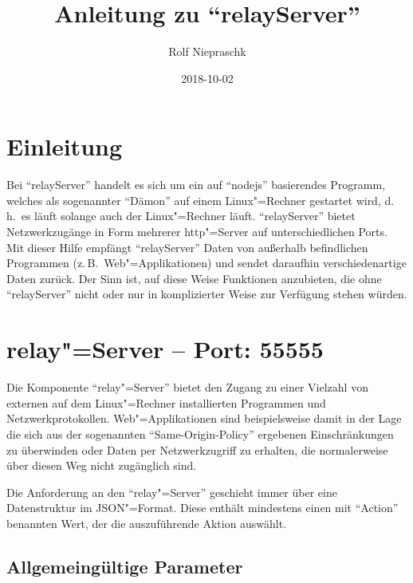 \documentclass[titlepage=false,toc=nobibliography]{vl-report}
\newcommand*\theServer{relayServer}
\begin{document}
\subject{PTB~--~AG~7.54}
\title{Anleitung zu "`\theServer"'}
\date{2018-10-02}
\author{Rolf Niepraschk}

\maketitle

\section*{Einleitung}

Bei "`\theServer"' handelt es sich um ein auf "`nodejs"' basierendes
Programm, welches als sogenannter "`Dämon"' auf einem Linux"=Rechner
gestartet wird, d.\,h.\ es läuft solange auch der Linux"=Rechner läuft.
"`\theServer"' bietet Netzwerkzugänge in Form mehrerer
http"=Server auf unterschiedlichen Ports. Mit dieser Hilfe empfängt
"`\theServer"' Daten von außerhalb befindlichen Programmen (z.\,B.\
Web"=Applikationen) und sendet daraufhin verschiedenartige Daten zurück. Der
Sinn ist, auf diese Weise Funktionen anzubieten, die ohne "`\theServer"'
nicht oder nur in komplizierter Weise zur Verfügung stehen würden.

\section{relay"=Server -- Port: 55555}

Die Komponente "`relay"=Server"' bietet den Zugang zu einer Vielzahl von
externen auf dem Linux"=Rechner installierten Programmen und
Netzwerkprotokollen. Web"=Applikationen sind beispielsweise damit in der Lage
die sich aus der sogenannten "`Same-Origin-Policy"' ergebenen
Einschränkungen zu überwinden oder Daten per Netzwerkzugriff zu erhalten,
die normalerweise über diesen Weg nicht zugänglich sind.

Die Anforderung an den "`relay"=Server"' geschieht immer über eine
Datenstruktur im JSON"=Format. Diese enthält mindestens einen mit "`Action"'
benannten Wert, der die auszuführende Aktion auswählt.

\subsection{Allgemeingültige Parameter}
\end{document}
